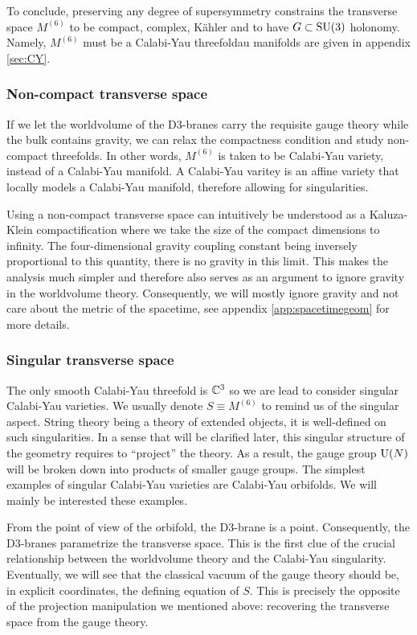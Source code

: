         To conclude, preserving any degree of supersymmetry constrains the transverse space $M^{(6)}$ to be compact, complex, Kähler and to have $G\subset\text{SU}(3)$ holonomy. Namely, $M^{(6)}$ must be a Calabi-Yau threefoldau manifolds are given in appendix \ref{sec:CY}.

    \subsubsection*{Non-compact transverse space}
    
        If we let the worldvolume of the D$3$-branes carry the requisite gauge theory while the bulk contains gravity, we can relax the compactness condition and study non-compact threefolds. In other words, $M^{(6)}$ is taken to be Calabi-Yau variety, instead of a Calabi-Yau manifold. A Calabi-Yau varitey is an affine variety that locally models a Calabi-Yau manifold, therefore allowing for singularities. 
        
        Using a non-compact transverse space can intuitively be understood as a Kaluza-Klein compactification where we take the size of the compact dimensions to infinity. The four-dimensional gravity coupling constant being inversely proportional to this quantity, there is no gravity in this limit. This makes the analysis much simpler and therefore also serves as an argument to ignore gravity in the worldvolume theory. Consequently, we will mostly ignore gravity and not care about the metric of the spacetime, see appendix \ref{app:spacetimegeom} for more details.

    \subsubsection*{Singular transverse space}

        The only smooth Calabi-Yau threefold is $\mathbb{C}^3$ so we are lead to consider singular Calabi-Yau varieties. We usually denote $S\equiv M^{(6)}$ to remind us of the singular aspect. String theory being a theory of extended objects, it is well-defined on such singularities. In a sense that will be clarified later, this singular structure of the geometry requires to ``project'' the theory. As a result, the gauge group $\text{U}(N)$ will be broken down into products of smaller gauge groups. The simplest examples of singular Calabi-Yau varieties are Calabi-Yau orbifolds. We will mainly be interested these examples.
    
        From the point of view of the orbifold, the D$3$-brane is a point. Consequently, the D$3$-branes parametrize the transverse space. This is the first clue of the crucial relationship between the worldvolume theory and the Calabi-Yau singularity. Eventually, we will see that the classical vacuum of the gauge theory should be, in explicit coordinates, the defining equation of $S$. This is precisely the opposite of the projection manipulation we mentioned above: recovering the transverse space from the gauge theory. 
        
